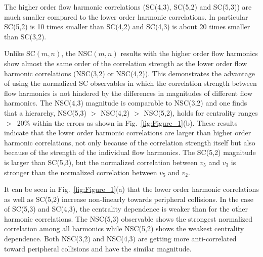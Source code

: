 The higher order flow harmonic correlations (SC(4,3), SC(5,2) and SC(5,3)) are much smaller compared to the lower order harmonic correlations.
In particular SC(5,2) is 10 times smaller than SC(4,2) and SC(4,3) is about 20 times smaller than SC(3,2).

Unlike SC$(m,n)$, the NSC$(m,n)$ results with the higher order flow harmonics show almost the same order of the correlation strength as the lower order flow harmonic correlations (NSC(3,2) or NSC(4,2)).
This demonstrates the advantage of using the normalized SC observables in which the correlation strength between flow harmonics is not hindered by the differences in magnitudes of different flow harmonics. The NSC(4,3) magnitude is comparable to NSC(3,2) and one finds that a hierarchy, NSC(5,3) $>$ NSC(4,2) $>$ NSC(5,2), holds for centrality ranges $>$~20\% within the errors as shown in Fig.~\ref{fig:Figure_1}(b).
These results indicate that the lower order harmonic correlations are larger than higher order harmonic correlations, not only because of the correlation strength itself but also because of the strength of the individual flow harmonics. 
The SC(5,2) magnitude is larger than SC(5,3), but the normalized correlation between $v_5$ and $v_3$ is stronger than the normalized correlation between $v_5$ and $v_2$. 

It can be seen in Fig.~\ref{fig:Figure_1}(a) that the lower order harmonic correlations as well as SC(5,2) increase non-linearly towards peripheral collisions.
In the case of SC(5,3) and SC(4,3), the centrality dependence is weaker than for the other harmonic correlations.
The NSC(5,3) observable shows the strongest normalized correlation among all harmonics while NSC(5,2) shows the weakest centrality dependence.
Both NSC(3,2) and NSC(4,3) are getting more anti-correlated toward peripheral collisions and have the similar magnitude.


